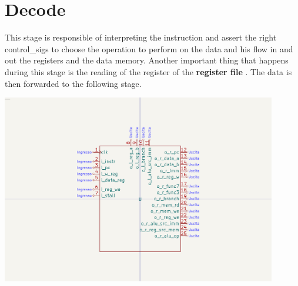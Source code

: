 \documentclass{article}
\begin{document}
\section{Decode}\label{DECODE}
\begin{minipage}{0.48\textwidth}
This stage is responsible of interpreting the instruction and assert the right \glspl{control_sig} to choose the operation to perform on the data and his flow in and out the registers and the data memory.
Another important thing that happens during this stage is the reading of the register of the \textbf{register file} . The data is then forwarded to the following stage.
\end{minipage}
\begin{minipage}{0.48\textwidth}
  \includegraphics[width=0.9\textwidth,right,trim={400 150 400 150},clip]{components/Decode.png}
\end{minipage}
\end{document}
